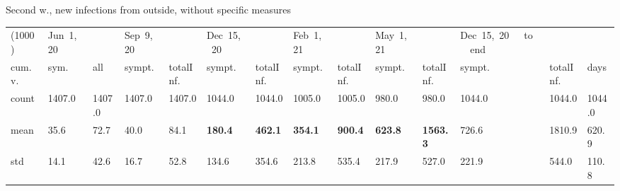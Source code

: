 \documentclass[8pt]{beamer}
\begin{document}
\begin{frame}{Second w., new infections from outside, without specific measures}
\begin{table}[H]
\center
\tiny
\begin{tabular}{p{0.4cm}p{0.3cm}p{0.3cm}p{0.3cm}p{0.3cm}p{0.3cm}p{0.3cm}p{0.3cm}p{0.3cm}p{0.3cm}p{0.3cm}p{0.3cm}p{0.3cm}p{0.4cm}}
\toprule
(1000) &  Jun~1,~20 & &  Sep~9,~20 & & Dec~15,~20 & & Feb~1,~21 & & May~1,~21 & & Dec~15,~20~~~to~~~end   \\
cum.~v. &  sym. &  all &  sympt. &  totalInf. &  sympt. &  totalInf. &  sympt. &  totalInf. &  sympt. &  totalInf. &  sympt. &  totalInf.  & days\\
\midrule
count &   1407.0 &                     1407.0 &   1407.0 &                     1407.0 &   1044.0 &                     1044.0 &   1005.0 &                     1005.0 &    980.0 &                      980.0 &              1044.0 &                  1044.0 & 1044.0 \\
mean  &     35.6 &                       72.7 &     40.0 &                       84.1 &    \textbf{180.4} &                      \textbf{462.1} &    \textbf{354.1} &                      \textbf{900.4} &    \textbf{623.8} &                     \textbf{1563.3} &               726.6 &                  1810.9 &  620.9 \\
std   &     14.1 &                       42.6 &     16.7 &                       52.8 &    134.6 &                      354.6 &    213.8 &                      535.4 &    217.9 &                      527.0 &               221.9 &                   544.0 &  110.8 \\
\bottomrule
\end{tabular}

\label{selForceWave2Tab}
\end{table}


\end{frame}
\end{document}
